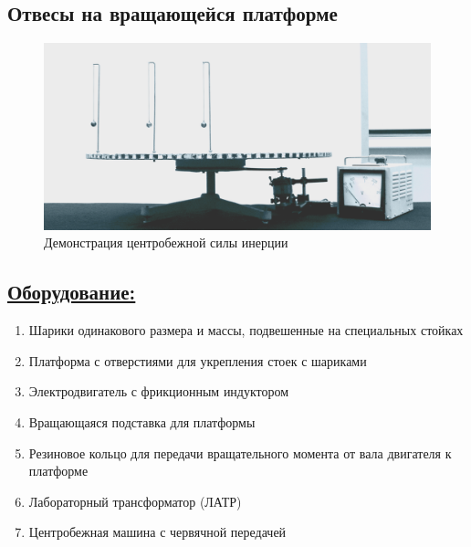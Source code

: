 \documentclass[14pt,a4paper,oneside]{extarticle}	%
\begin{document}
	
	\begin{center}
		\subsection*{Отвесы на вращающейся платформе}
	\end{center}
	
	\begin{figure}[H] 	
		\centering 	
		\includegraphics[width=0.9\linewidth]{platform-1.png}
		\caption{Демонстрация центробежной силы инерции}
		\label{platform-1}
	\end{figure}
	
	\subsection*{\underline{Оборудование:}}

	\begin{enumerate} 
		\item Шарики одинакового размера и массы, подвешенные на специальных стойках
		\item Платформа с отверстиями для укрепления стоек с шариками
		\item Электродвигатель с фрикционным индуктором
		\item Вращающаяся подставка для платформы
		\item Резиновое кольцо для передачи вращательного момента от вала двигателя к платформе
		\item Лабораторный трансформатор (ЛАТР)
		\item Центробежная машина с червячной передачей
	\end{enumerate}
\end{document}
